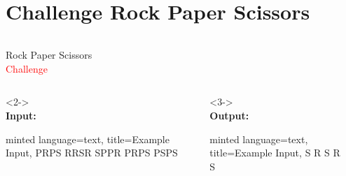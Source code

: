     \section{Challenge Rock Paper Scissors}\label{sec:challenge-rps}
    \begin{frame}[c, fragile]
        \slidehead
        \begin{columns}[c]
            \begin{column}{.5\textwidth}
                \Large
                \centering
                Rock Paper Scissors\\
                \textcolor{red}{Challenge}
                \vspace{1em}
                \normalsize

                \begin{columns}[c]
                    \begin{column}{.5\textwidth}
                        \begin{onlyenv}<2->
                            \mbox{}
                            \\
                            \textbf{Input:}
                            \begin{codeBlock}{
                                minted language=text,
                                title=Example Input,
                            }
                                PRPS
                                RRSR
                                SPPR
                                PRPS
                                PSPS
                            \end{codeBlock}
                        \end{onlyenv}
                    \end{column}
                    \begin{column}{.5\textwidth}
                        \begin{onlyenv}<3->
                            \mbox{}
                            \\
                            \textbf{Output:}
                            \begin{codeBlock}{
                                minted language=text,
                                title=Example Input,
                            }
                                S
                                R
                                S
                                R
                                S
                            \end{codeBlock}
                        \end{onlyenv}
                    \end{column}
                \end{columns}
            \end{column}
            \begin{column}{.5\textwidth}
                \centering
                
            \end{column}
        \end{columns}
    \end{frame}


